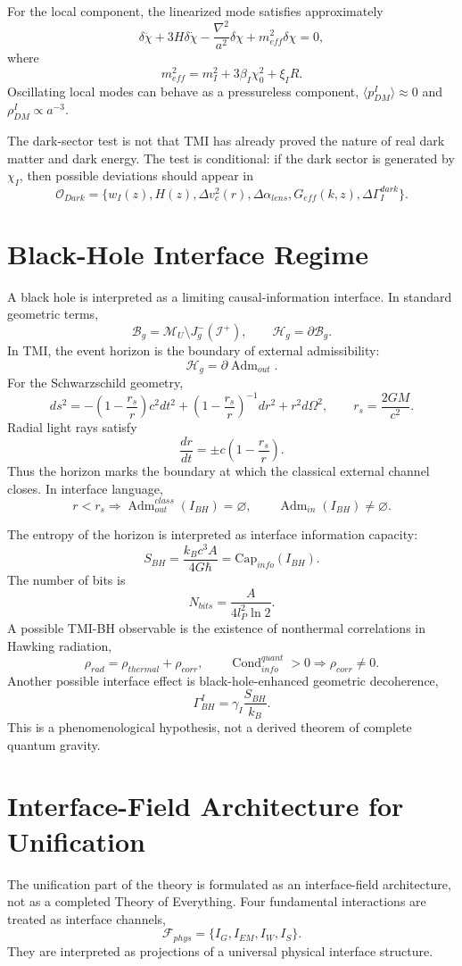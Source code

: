 \documentclass[12pt,a4paper]{article}
\DeclareMathOperator{\Adm}{Adm}
\DeclareMathOperator{\Cond}{Cond}
\newcommand{\M}{\mathcal M_U}
\begin{document}
For the local component, the linearized mode satisfies approximately
\[
\boxed{
\delta\ddot\chi+3H\delta\dot\chi-\frac{\nabla^2}{a^2}\delta\chi+m_{eff}^2\delta\chi=0,
}
\]
where
\[
\boxed{m_{eff}^2=m_I^2+3\beta_I\chi_0^2+\xi_I R.}
\]
Oscillating local modes can behave as a pressureless component, $\langle p_{DM}^{I}\rangle\approx0$ and $\rho_{DM}^{I}\propto a^{-3}$.

The dark-sector test is not that TMI has already proved the nature of real dark matter and dark energy. The test is conditional: if the dark sector is generated by $\chi_I$, then possible deviations should appear in
\[
\boxed{
\mathcal O_{Dark}=\{w_I(z),H(z),\Delta v_c^2(r),\Delta\alpha_{lens},G_{eff}(k,z),\Delta\Gamma_I^{dark}\}.
}
\]

\section{Black-Hole Interface Regime}
A black hole is interpreted as a limiting causal-information interface. In standard geometric terms,
\[
\boxed{
\mathcal B_g=\M\setminus J_g^-(\mathcal I^+),
\qquad
\mathcal H_g=\partial\mathcal B_g.
}
\]
In TMI, the event horizon is the boundary of external admissibility:
\[
\boxed{\mathcal H_g=\partial\Adm_{out}.}
\]
For the Schwarzschild geometry,
\[
\boxed{
ds^2=-\left(1-\frac{r_s}{r}\right)c^2dt^2+\left(1-\frac{r_s}{r}\right)^{-1}dr^2+r^2d\Omega^2,
\qquad
r_s=\frac{2GM}{c^2}.
}
\]
Radial light rays satisfy
\[
\boxed{\frac{dr}{dt}=\pm c\left(1-\frac{r_s}{r}\right).}
\]
Thus the horizon marks the boundary at which the classical external channel closes. In interface language,
\[
\boxed{r<r_s\Rightarrow \Adm_{out}^{class}(I_{BH})=\varnothing,
\qquad \Adm_{in}(I_{BH})\neq\varnothing.}
\]

The entropy of the horizon is interpreted as interface information capacity:
\[
\boxed{
S_{BH}=\frac{k_Bc^3A}{4G\hbar}=\mathrm{Cap}_{info}(I_{BH}).
}
\]
The number of bits is
\[
\boxed{N_{bits}=\frac{A}{4l_P^2\ln2}.}
\]
A possible TMI-BH observable is the existence of nonthermal correlations in Hawking radiation,
\[
\boxed{
\rho_{rad}=\rho_{thermal}+\rho_{corr},
\qquad
\Cond_{info}^{quant}>0\Rightarrow \rho_{corr}\neq0.
}
\]
Another possible interface effect is black-hole-enhanced geometric decoherence,
\[
\boxed{
\Gamma_{BH}^{I}=\gamma_I\frac{S_{BH}}{k_B}.
}
\]
This is a phenomenological hypothesis, not a derived theorem of complete quantum gravity.

\section{Interface-Field Architecture for Unification}
The unification part of the theory is formulated as an interface-field architecture, not as a completed Theory of Everything. Four fundamental interactions are treated as interface channels,
\[
\boxed{
\mathcal F_{phys}=\{I_G,I_{EM},I_W,I_S\}.
}
\]
They are interpreted as projections of a universal physical interface structure.
\end{document}
